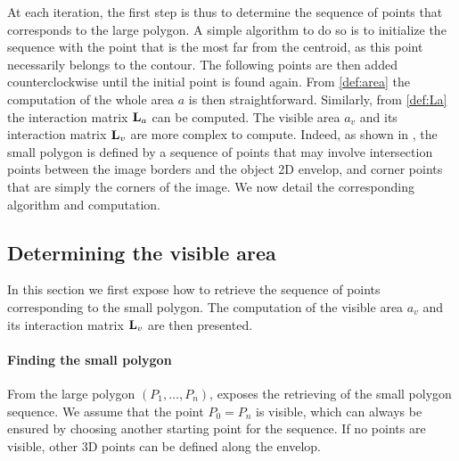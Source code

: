 \documentclass[letterpaper, 10 pt, conference]{IEEEtran}  %
\begin{document}
At each iteration, the first step is thus to determine the sequence of points that corresponds to the large polygon. A simple algorithm to do so is to initialize the sequence with the point that is the most far from the centroid, as this point necessarily belongs to the contour. The following points are then added counterclockwise until the initial point is found again.
From \eqref{def:area} the computation of the whole area $a$ is then straightforward. Similarly, from \eqref{def:La} the interaction matrix $\mathbf{L}_a$ can be computed.
The visible area $a_v$ and its interaction matrix $\mathbf{L}_v$ are more complex to compute. Indeed, as shown in , the small polygon is defined by a sequence of points that may involve intersection points between the image borders and the object 2D envelop, and corner points that are simply the corners of the image. We now detail the corresponding algorithm and computation.


\subsection{Determining the visible area}

In this section we first expose how to retrieve the sequence of points corresponding to the small polygon. 
The computation of the visible area $a_v$ and its interaction matrix $\mathbf{L}_v$ are then presented.



\paragraph{Finding the small polygon}

From the large polygon $(P_1, \hdots, P_n)$,  exposes the retrieving of the small polygon sequence. 
We assume that the point $P_0 = P_n$ is visible, which can always be ensured by choosing another starting point for the sequence.
If no points are visible, other 3D points can be defined along the envelop. 
\end{document}
